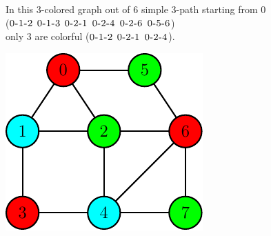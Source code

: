 
	\begin{minipage}{0.55\textwidth}\raggedright
		\begin{esempio}
		\end{esempio}
		
		In this $3$-colored graph out of $6$ simple $3$-path starting from $0$\\
		($\textsc{0-1-2}$ $\textsc{0-1-3}$ $\textsc{0-2-1}$ $\textsc{0-2-4}$ $\textsc{0-2-6}$ $\textsc{0-5-6}$)\\ 
		only $3$ are colorful ($\textsc{0-1-2}$ $\textsc{0-2-1}$ $\textsc{0-2-4}$).
	\end{minipage}
	\begin{minipage}{0.35\textwidth}
		\includegraphics[width=\linewidth]{figure/figure-2-6}
	\end{minipage}

\noindent
\\

\clearpage
